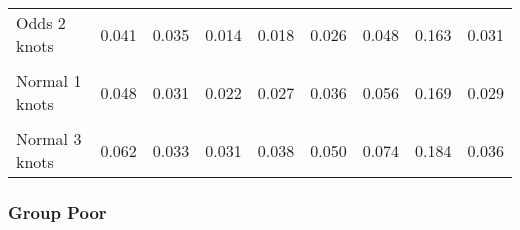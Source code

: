 \documentclass[
]{article}
\begin{document}
\begin{table}[H]
{\begin{tabular}[t]{lrrrrrrrr}
Odds 2 knots & 0.041 & 0.035 & 0.014 & 0.018 & 0.026 & 0.048 & 0.163 & 0.031\\
\cellcolor{gray!10}{Odds 3 knots} & \cellcolor{gray!10}{0.046} & \cellcolor{gray!10}{0.037} & \cellcolor{gray!10}{0.016} & \cellcolor{gray!10}{0.021} & \cellcolor{gray!10}{0.031} & \cellcolor{gray!10}{0.057} & \cellcolor{gray!10}{0.175} & \cellcolor{gray!10}{0.036}\\
Normal 1 knots & 0.048 & 0.031 & 0.022 & 0.027 & 0.036 & 0.056 & 0.169 & 0.029\\
\cellcolor{gray!10}{Normal 2 knots} & \cellcolor{gray!10}{0.049} & \cellcolor{gray!10}{0.031} & \cellcolor{gray!10}{0.023} & \cellcolor{gray!10}{0.028} & \cellcolor{gray!10}{0.037} & \cellcolor{gray!10}{0.058} & \cellcolor{gray!10}{0.168} & \cellcolor{gray!10}{0.030}\\
Normal 3 knots & 0.062 & 0.033 & 0.031 & 0.038 & 0.050 & 0.074 & 0.184 & 0.036\\
\bottomrule
\end{tabular}}
\end{table}

\clearpage

\subsubsection{Group Poor}\label{group-poor}
\end{document}
